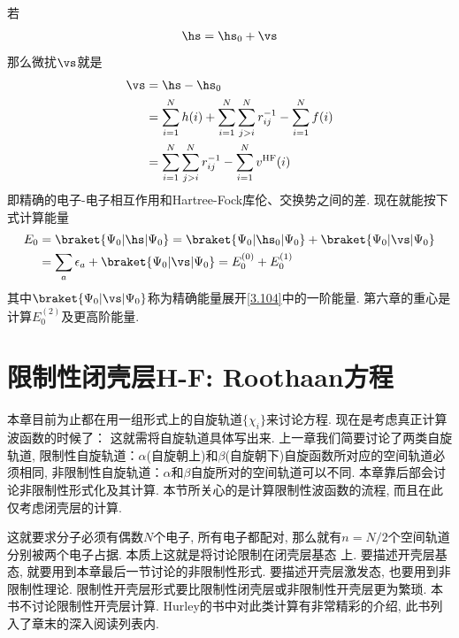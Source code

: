 若
\begin{align}\label{3.107}
	\hs = \hs_0 + \vs
\end{align}
那么微扰$\vs$就是
\begin{align}
	\vs & = \hs -\hs_0\notag\\
	& = \sum_{i=1}^{N}h(i) + \sum_{i=1}^{N}\sum_{j>i}^{N}r_{ij}^{-1} - \sum_{i=1}^{N}f(i)\notag\\
	& = \sum_{i=1}^{N}\sum_{j>i}^{N}r_{ij}^{-1} - \sum_{i=1}^{N}v^\mathrm{HF}(i)
	\label{3.108}
\end{align}
即精确的电子-电子相互作用和Hartree-Fock库伦、交换势之间的差. 
现在就能按下式计算\hft 能量
\begin{align}\label{3.109}
	E_0 & = \braket{\Psi_0|\hs|\Psi_0} = \braket{\Psi_0|\hs_0|\Psi_0} + \braket{\Psi_0|\vs|\Psi_0} \notag\\
	& = \sum_a\epsilon_a + \braket{\Psi_0|\vs|\Psi_0} = E_0^{(0)} + E_0^{(1)}
\end{align}
其中$\braket{\Psi_0|\vs|\Psi_0}$称为精确能量展开\autoref{3.104}中的一阶能量. 
第六章的重心是计算$E_0^{(2)}$及更高阶能量.

\section{限制性闭壳层H-F: Roothaan方程}
本章目前为止都在用一组形式上的自旋轨道$\{\chi_i\}$来讨论\hft 方程. 
现在是考虑真正计算\hft 波函数的时候了：
这就需将自旋轨道具体写出来. 
上一章我们简要讨论了两类自旋轨道, 
限制性自旋轨道：$\alpha$(自旋朝上)和$\beta$(自旋朝下)自旋函数所对应的空间轨道必须相同, 
非限制性自旋轨道：$\alpha$和$\beta$自旋所对的空间轨道可以不同. 
本章靠后部会讨论非限制性\hft 形式化及其计算. 
本节所关心的是计算限制性\hft 波函数的流程, 
而且在此仅考虑闭壳层的计算.

这就要求分子必须有偶数$N$个电子, 所有电子都配对, 那么就有$n=N/2$个空间轨道分别被两个电子占据. 本质上这就是将讨论限制在闭壳层基态
上. 
要描述开壳层基态, 就要用到本章最后一节讨论的非限制性形式. 
要描述开壳层激发态, 也要用到非限制性\hft 理论. 
限制性开壳层形式要比限制性闭壳层或非限制性开壳层更为繁琐. 
本书不讨论限制性开壳层\hft 计算. 
Hurley的书中对此类计算有非常精彩的介绍, 此书列入了章末的深入阅读列表内.

